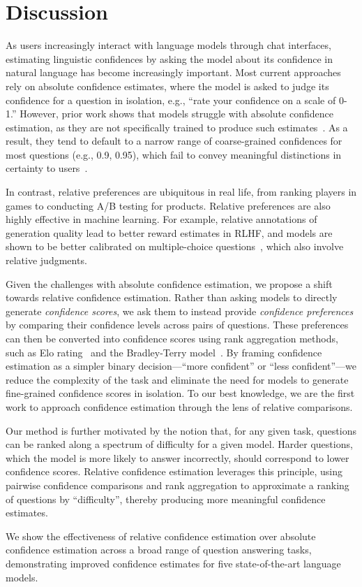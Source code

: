 \section{Discussion}

As users increasingly interact with language models through chat interfaces, estimating linguistic confidences by asking the model about its confidence in natural language has become increasingly important. Most current approaches rely on absolute confidence estimates, where the model is asked to judge its confidence for a question in isolation, e.g., “rate your confidence on a scale of 0-1.” However, prior work shows that models struggle with absolute confidence estimation, as they are not specifically trained to produce such estimates~\citep{zhou2023navigating}. As a result, they tend to default to a narrow range of coarse-grained confidences for most questions (e.g., 0.9, 0.95), which fail to convey meaningful distinctions in certainty to users~\citep{surrogate-models}.

In contrast, relative preferences are ubiquitous in real life, from ranking players in games to conducting A/B testing for products. Relative preferences are also highly effective in machine learning. For example, relative annotations of generation quality lead to better reward estimates in RLHF, and models are shown to be better calibrated on multiple-choice questions~\citep{kadavath2022language}, which also involve relative judgments.

Given the challenges with absolute confidence estimation, we propose a shift towards relative confidence estimation. Rather than asking models to directly generate \textit{confidence scores}, we ask them to instead provide \textit{confidence preferences} by comparing their confidence levels across pairs of questions. These preferences can then be converted into confidence scores using rank aggregation methods, such as Elo rating~\citep{elo_ratings} and the Bradley-Terry model~\citep{bradley_terry}. By framing confidence estimation as a simpler binary decision—``more confident'' or ``less confident''—we reduce the complexity of the task and eliminate the need for models to generate fine-grained confidence scores in isolation. To our best knowledge, we are the first work to approach confidence estimation through the lens of relative comparisons.

Our method is further motivated by the notion that, for any given task, questions can be ranked along a spectrum of difficulty for a given model. Harder questions, which the model is more likely to answer incorrectly, should correspond to lower confidence scores. Relative confidence estimation leverages this principle, using pairwise confidence comparisons and rank aggregation to approximate a ranking of questions by ``difficulty'', thereby producing more meaningful confidence estimates.

We show the effectiveness of relative confidence estimation over absolute confidence estimation across a broad range of question answering tasks, demonstrating improved confidence estimates for five state-of-the-art language models.

